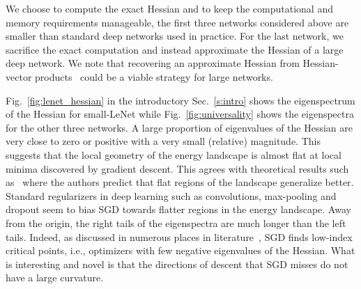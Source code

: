 \documentclass[10pt]{article}
\begin{document}
We choose to compute the exact Hessian and to keep the computational and memory requirements manageable, the first three networks considered above are smaller than standard deep networks used in practice. For the last network, we sacrifice the exact computation and instead approximate the Hessian of a large deep network. We note that recovering an approximate Hessian from Hessian-vector products~\citep{pearlmutter1994fast} could be a viable strategy for large networks.

Fig.~\ref{fig:lenet_hessian} in the introductory Sec.~\ref{s:intro} shows the eigenspectrum of the Hessian for small-LeNet while Fig.~\ref{fig:universality} shows the eigenspectra for the other three networks.
%
A large proportion of eigenvalues of the Hessian are very close to zero or positive with a very small (relative) magnitude. This suggests that the local geometry of the energy landscape is almost flat at local minima discovered by gradient descent. This agrees with theoretical results such as~\citet{baldassi2016local} where the authors predict that flat regions of the landscape generalize better. Standard regularizers in deep learning such as convolutions, max-pooling and dropout seem to bias SGD towards flatter regions in the energy landscape.
%
Away from the origin, the right tails of the eigenspectra are much longer than the left tails. Indeed, as discussed in numerous places in literature~\citep{Bray2007,dauphin2014identifying,spinglass2015}, SGD finds low-index critical points, i.e., optimizers with few negative eigenvalues of the Hessian. What is interesting and novel is that the directions of descent that SGD misses do not have a large curvature.
\end{document}
